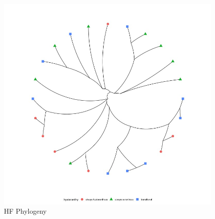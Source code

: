 \documentclass[12pt]{article}\usepackage[]{graphicx}\usepackage[]{color}
\begin{document}
    \begin{figure}
    \centering
    \includegraphics[height=.4\textheight]{..//figure/HFtreeplot.jpeg}
    \caption{HF Phylogeny}
    \label{fig:Figure 10}
    \end{figure}
\end{document}
